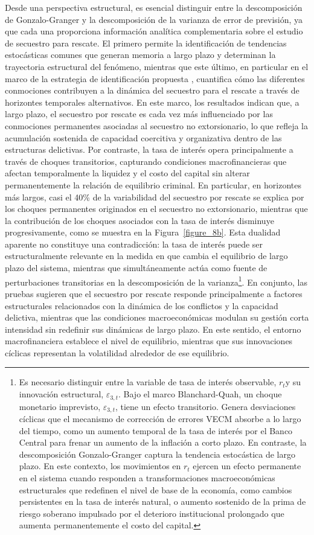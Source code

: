 \documentclass[12pt]{article}
\providecommand{\textcite}{\citet}
\theoremstyle{definition}
\theoremstyle{remark}
\newcommand{\1}{\mathbf{1}}
\begin{document}
Desde una perspectiva estructural, es esencial distinguir entre la descomposición de Gonzalo-Granger y la descomposición de la varianza de error de previsión, ya que cada una proporciona información analítica complementaria sobre el estudio de secuestro para rescate. El primero permite la identificación de tendencias estocásticas comunes que generan memoria a largo plazo y determinan la trayectoria estructural del fenómeno, mientras que este último, en particular en el marco de la estrategia de identificación propuesta \textcite{Blanchard1989}, cuantifica cómo las diferentes conmociones contribuyen a la dinámica del secuestro para el rescate a través de horizontes temporales alternativos. En este marco, los resultados indican que, a largo plazo, el secuestro por rescate es cada vez más influenciado por las conmociones permanentes asociadas al secuestro no extorsionario, lo que refleja la acumulación sostenida de capacidad coercitiva y organizativa dentro de las estructuras delictivas. Por contraste, la tasa de interés opera principalmente a través de choques transitorios, capturando condiciones macrofinancieras que afectan temporalmente la liquidez y el costo del capital sin alterar permanentemente la relación de equilibrio criminal. En particular, en horizontes más largos, casi el 40\% de la variabilidad del secuestro por rescate se explica por los choques permanentes originados en el secuestro no extorsionario, mientras que la contribución de los choques asociados con la tasa de interés disminuye progresivamente, como se muestra en la Figura~\ref{figure_8b}. Esta dualidad aparente no constituye una contradicción: la tasa de interés puede ser estructuralmente relevante en la medida en que cambia el equilibrio de largo plazo del sistema, mientras que simultáneamente actúa como fuente de perturbaciones transitorias en la descomposición de la varianza\footnote{Es necesario distinguir entre la variable de tasa de interés observable, $r_t$y su innovación estructural, $\varepsilon_{3,t}$. Bajo el marco Blanchard-Quah, un choque monetario imprevisto, $\varepsilon_{3,t}$, tiene un efecto transitorio. Genera desviaciones cíclicas que el mecanismo de corrección de errores VECM absorbe a lo largo del tiempo, como un aumento temporal de la tasa de interés por el Banco Central para frenar un aumento de la inflación a corto plazo. En contraste, la descomposición Gonzalo-Granger captura la tendencia estocástica de largo plazo. En este contexto, los movimientos en $r_t$ ejercen un efecto permanente en el sistema cuando responden a transformaciones macroeconómicas estructurales que redefinen el nivel de base de la economía, como cambios persistentes en la tasa de interés natural, o aumento sostenido de la prima de riesgo soberano impulsado por el deterioro institucional prolongado que aumenta permanentemente el costo del capital.}. En conjunto, las pruebas sugieren que el secuestro por rescate responde principalmente a factores estructurales relacionados con la dinámica de los conflictos y la capacidad delictiva, mientras que las condiciones macroeconómicas modulan su gestión corta intensidad sin redefinir sus dinámicas de largo plazo. En este sentido, el entorno macrofinanciera establece el nivel de equilibrio, mientras que sus innovaciones cíclicas representan la volatilidad alrededor de ese equilibrio.
\end{document}

